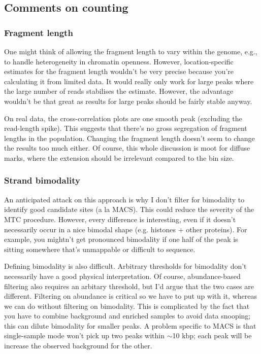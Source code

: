 \documentclass[12pt]{report}
\begin{document}
\subsection*{Comments on counting}

\subsubsection*{Fragment length}

One might think of allowing the fragment length to vary within the genome, e.g., to handle heterogeneity in chromatin openness.
However, location-specific estimates for the fragment length wouldn't be very precise because you're calculating it from limited data. 
It would really only work for large peaks where the large number of reads stabilises the estimate. 
However, the advantage wouldn't be that great as results for large peaks should be fairly stable anyway.

On real data, the cross-correlation plots are one smooth peak (excluding the read-length spike). 
This suggests that there's no gross segregation of fragment lengths in the population. 
Changing the fragment length doesn't seem to change the results too much either. 
Of course, this whole discussion is moot for diffuse marks, where the extension should be irrelevant compared to the bin size.

\subsubsection*{Strand bimodality}

An anticipated attack on this approach is why I don't filter for bimodality to identify good candidate sites (a la MACS). 
This could reduce the severity of the MTC procedure. 
However, every difference is interesting, even if it doesn't necessarily occur in a nice bimodal shape (e.g. histones + other proteins).
For example, you mightn't get pronounced bimodality if one half of the peak is sitting somewhere that's unmappable or difficult to sequence. 

Defining bimodality is also difficult. 
Arbitrary thresholds for bimodality don't necessarily have a good physical interpretation. 
Of course, abundance-based filtering also requires an arbitary threshold, but I'd argue that the two cases are different.
Filtering on abundance is critical so we have to put up with it, whereas we can do without filtering on bimodality.
This is complicated by the fact that you have to combine background and enriched samples to avoid data snooping; this can dilute bimodality for smaller peaks.
A problem specific to MACS is that single-sample mode won't pick up two peaks within $\sim$10 kbp; each peak will be increase the observed background for the other.
\end{document}
